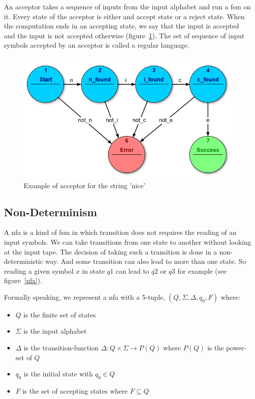 \documentclass[12pt]{article}
\theoremstyle{definition}
\theoremstyle{definition}
\begin{document}
An acceptor takes a sequence of inputs from the input alphabet and run a \gls{fsm} on it. Every state of the acceptor is either and accept state or a reject state. When the computation ends in an accepting state, we say that the input is accepted and the input is not accepted otherwise (figure~\ref{acceptor}). The set of sequence of input symbols accepted by an acceptor is called a regular language.\\

\begin{figure}
    \centering
    \includegraphics[scale=0.8]{acceptor.png}
    \caption{Example of acceptor for the string 'nice'~\cite{FSM:2017}}
    \label{acceptor}
\end{figure}

\subsection{Non-Determinism}

A \gls{nfa} is a kind of \gls{fsm} in which transition does not requires the reading of an input symbols. We can take transitions from one state to another without looking at the input tape. The decision of taking such a transition is done in a non-deterministic way. And some transition can also lead to more than one state. So reading a given symbol $x$ in state $q1$ can lead to $q2$ or $q3$ for example (see figure~\ref{nfa}).~\cite{FA-DecisionProblems:1959}

Formally speaking, we represent a \gls{nfa} with a 5-tuple, $(Q, \Sigma, \Delta, q_0, F)$ where:

\begin{itemize}
\item $Q$ is the finite set of states
\item $\Sigma$ is the input alphabet
\item $\Delta$ is the transition-function $\Delta: Q \times \Sigma \rightarrow P(Q)$ where $P(Q)$ is the power-set of $Q$
\item $q_0$ is the initial state with $q_0 \in Q$
\item $F$ is the set of accepting states where $F \subseteq Q$
\end{itemize}
\end{document}
